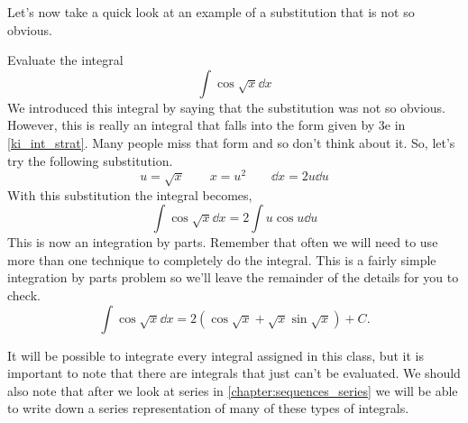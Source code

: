 Let's now take a quick look at an example of a substitution that is not so obvious.

\begin{example}\label{ex_int_strat_cos_sqrt}%
Evaluate the integral
\[\int \cos \sqrt x\dd x\]
\solution
We introduced this integral by saying that the substitution was not so obvious. However, this is really an integral that falls into the form given by 3e in \autoref{ki_int_strat}. Many people miss that form and so don't think about it. So, let's try the following substitution.
\[u = \sqrt x \qquad x=u^2 \qquad\dd x=2u\dd u\]
With this substitution the integral becomes,
\[\int \cos \sqrt x\dd x = 2\int u \cos u\dd u\]
This is now an integration by parts. Remember that often we will need to use more than one technique to completely do the integral. This is a fairly simple integration by parts problem so we'll leave the remainder of the details for you to check.
\[\int \cos \sqrt x\dd x =2(\cos \sqrt x + \sqrt x \sin \sqrt x) + C.\]
\end{example}

\bigskip
It will be possible to integrate every integral assigned in this class, but it is important to note that there are integrals that just can't be evaluated. We should also note that after we look at series in \autoref{chapter:sequences_series} we will be able to write down a series representation of many of these types of integrals.


